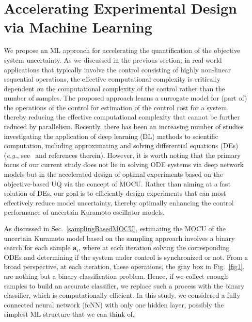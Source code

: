 \documentclass{article}
\begin{document}
\section{Accelerating Experimental Design via Machine Learning}
\label{sec:accelerate_oed}
We propose an ML approach for accelerating the quantification of the objective system uncertainty. As we discussed in the previous section, in real-world applications that typically involve the control consisting of highly non-linear sequential operations, the effective computational complexity is critically dependent on the computational complexity of the control rather than the number of samples. The proposed approach learns a surrogate model for (part of) the operations of the control for estimation of the control cost for a system, thereby reducing the effective computational complexity that cannot be further reduced by parallelism. Recently, there has been an increasing number of studies investigating the application of deep learning (DL) methods to scientific computation, including approximating and solving differential equations (DEs) (\textit{e.g.}, see~\cite{L712178, Han8505, RAISSI2019686} and references therein). However, it is worth noting that the primary focus of our current study does not lie in solving ODE systems via deep network models but in the accelerated design of optimal experiments based on the objective-based UQ via the concept of MOCU. Rather than aiming at a fast solution of DEs, our goal is to efficiently design experiments that can most effectively reduce model uncertainty, thereby optimally enhancing the control performance of uncertain Kuramoto oscillator models.

As discussed in Sec.~\ref{samplingBasedMOCU}, estimating the MOCU of the uncertain Kuramoto model based on the sampling approach involves a binary search for each sample ${\mathbf{a}_i}$, where at each iteration solving the corresponding ODEs and determining if the system under control is synchronized or not. From a broad perspective, at each iteration, these operations, the gray box in Fig.~\ref{fig1}, are nothing but a binary classification problem. Hence, if we collect enough samples to build an accurate classifier, we replace such a process with the binary classifier, which is computationally efficient. In this study, we considered a fully connected neural network (fcNN) with only one hidden layer, possibly the simplest ML structure that we can think of.
\end{document}

